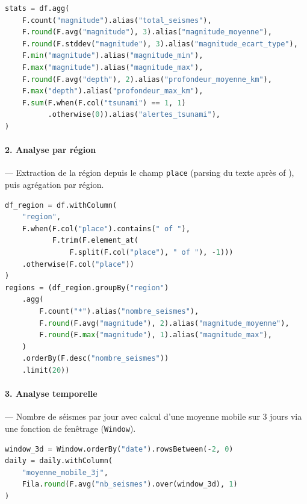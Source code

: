 \documentclass[12pt,a4paper]{article}
\begin{document}
\begin{lstlisting}[language=Python, caption={Analyse globale avec Spark}]
stats = df.agg(
    F.count("magnitude").alias("total_seismes"),
    F.round(F.avg("magnitude"), 3).alias("magnitude_moyenne"),
    F.round(F.stddev("magnitude"), 3).alias("magnitude_ecart_type"),
    F.min("magnitude").alias("magnitude_min"),
    F.max("magnitude").alias("magnitude_max"),
    F.round(F.avg("depth"), 2).alias("profondeur_moyenne_km"),
    F.max("depth").alias("profondeur_max_km"),
    F.sum(F.when(F.col("tsunami") == 1, 1)
          .otherwise(0)).alias("alertes_tsunami"),
)
\end{lstlisting}

% 

\paragraph{2. Analyse par région} — Extraction de la région depuis le champ \texttt{place} (parsing du texte après \og of \fg{}), puis agrégation par région.

\begin{lstlisting}[language=Python, caption={Extraction de la région et agrégation}]
df_region = df.withColumn(
    "region",
    F.when(F.col("place").contains(" of "),
           F.trim(F.element_at(
               F.split(F.col("place"), " of "), -1)))
    .otherwise(F.col("place"))
)
regions = (df_region.groupBy("region")
    .agg(
        F.count("*").alias("nombre_seismes"),
        F.round(F.avg("magnitude"), 2).alias("magnitude_moyenne"),
        F.round(F.max("magnitude"), 1).alias("magnitude_max"),
    )
    .orderBy(F.desc("nombre_seismes"))
    .limit(20))
\end{lstlisting}

% 

\paragraph{3. Analyse temporelle} — Nombre de séismes par jour avec calcul d'une moyenne mobile sur 3 jours via une fonction de fenêtrage (\texttt{Window}).

\begin{lstlisting}[language=Python, caption={Moyenne mobile sur 3 jours avec Spark Window}]
window_3d = Window.orderBy("date").rowsBetween(-2, 0)
daily = daily.withColumn(
    "moyenne_mobile_3j",
    Fila.round(F.avg("nb_seismes").over(window_3d), 1)
)
\end{lstlisting}
\end{document}
